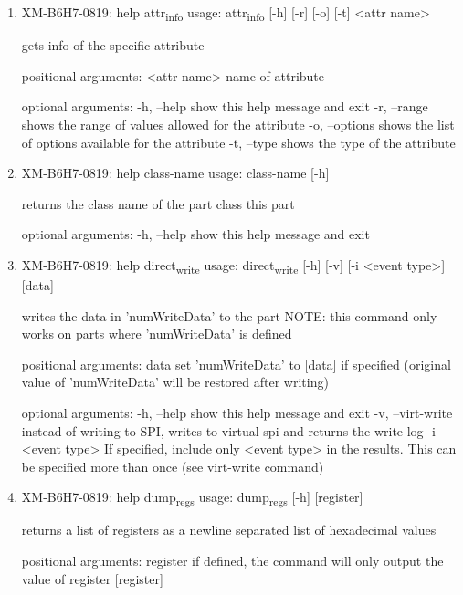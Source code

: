 \documentclass[11pt]{article}
\begin{document}
\begin{enumerate}
\item XM-B6H7-0819: help attr\textsubscript{info}
\label{sec:org4869844}
usage: attr\textsubscript{info} [-h] [-r] [-o] [-t] <attr name>

gets info of the specific attribute

positional arguments:
  <attr name>    name of attribute

optional arguments:
  -h, --help     show this help message and exit
  -r, --range    shows the range of values allowed for the attribute
  -o, --options  shows the list of options available for the attribute
  -t, --type     shows the type of the attribute

\item XM-B6H7-0819: help class-name
\label{sec:org8891ec2}
usage: class-name [-h]

returns the class name of the part class this part

optional arguments:
  -h, --help  show this help message and exit

\item XM-B6H7-0819: help direct\textsubscript{write}
\label{sec:orgeaea936}
usage: direct\textsubscript{write} [-h] [-v] [-i <event type>] [data]

writes the data in 'numWriteData' to the part NOTE: this command only works on
parts where 'numWriteData' is defined

positional arguments:
  data              set 'numWriteData' to [data] if specified (original value
                    of 'numWriteData' will be restored after writing)

optional arguments:
  -h, --help        show this help message and exit
  -v, --virt-write  instead of writing to SPI, writes to virtual spi and
                    returns the write log
  -i <event type>   If specified, include only <event type> in the results.
                    This can be specified more than once (see virt-write
                    command)

\item XM-B6H7-0819: help dump\textsubscript{regs}
\label{sec:orge1653e0}
usage: dump\textsubscript{regs} [-h] [register]

returns a list of registers as a newline separated list of hexadecimal values

positional arguments:
  register    if defined, the command will only output the value of register
              [register]


\end{enumerate}
\end{document}
